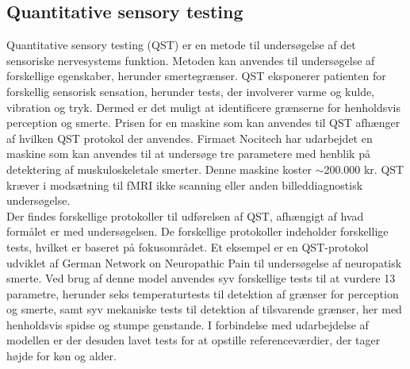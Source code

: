 \subsection{Quantitative sensory testing}
Quantitative sensory testing (QST) er en metode til undersøgelse af det sensoriske nervesystems funktion. Metoden kan anvendes til undersøgelse af forskellige egenskaber, herunder smertegrænser. QST eksponerer patienten for forskellig sensorisk sensation, herunder tests, der involverer varme og kulde, vibration og tryk. Dermed er det muligt at identificere grænserne for henholdsvis perception og smerte. \citep{Yarnitsky2006} Prisen for en maskine som kan anvendes til QST afhænger af hvilken QST protokol der anvendes. Firmaet Nocitech har udarbejdet en maskine som kan anvendes til at undersøge tre parametere med henblik på detektering af muskuloskeletale smerter. Denne maskine koster $\sim$200.000 kr. \citep{NociTech2016} QST kræver i modsætning til fMRI ikke scanning eller anden billeddiagnostisk undersøgelse. \\
Der findes forskellige protokoller til udførelsen af QST, afhængigt af hvad formålet er med undersøgelsen. De forskellige protokoller indeholder forskellige tests, hvilket er baseret på fokusområdet. Et eksempel er en QST-protokol udviklet af German Network on Neuropathic Pain til undersøgelse af neuropatisk smerte. Ved brug af denne model anvendes syv forskellige tests til at vurdere 13 parametre, herunder seks temperaturtests til detektion af grænser for perception og smerte, samt syv mekaniske tests til detektion af tilsvarende grænser, her med henholdsvis spidse og stumpe genstande. I forbindelse med udarbejdelse af modellen er der desuden lavet tests for at opstille referenceværdier, der tager højde for køn og alder. \citep{Rolke2006}  


